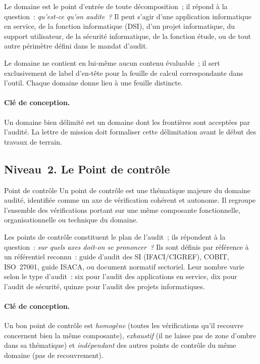 Le domaine est le point d'entrée de toute décomposition~; il répond à la
question~: \emph{qu'est-ce qu'on audite~?} Il peut s'agir d'une application
informatique en service, de la fonction informatique (DSI), d'un projet
informatique, du support utilisateur, de la sécurité informatique, de la
fonction étude, ou de tout autre périmètre défini dans le mandat d'audit.

Le domaine ne contient en lui-même aucun contenu évaluable~; il sert
exclusivement de label d'en-tête pour la feuille de calcul correspondante dans
l'outil. Chaque domaine donne lieu à une feuille distincte.

\paragraph{Clé de conception.}
Un domaine bien délimité est un domaine dont les frontières sont acceptées par
l'audité. La lettre de mission doit formaliser cette délimitation avant le début
des travaux de terrain.

\subsection{Niveau~2. Le Point de contrôle}

\begin{boxdef}{Point de contrôle}
Un point de contrôle est une thématique majeure du domaine audité, identifiée
comme un axe de vérification cohérent et autonome. Il regroupe l'ensemble des
vérifications portant sur une même composante fonctionnelle, organisationnelle
ou technique du domaine.
\end{boxdef}

Les points de contrôle constituent le plan de l'audit~; ils répondent à la
question~: \emph{sur quels axes doit-on se prononcer~?} Ils sont définis par
référence à un référentiel reconnu~: guide d'audit des SI (IFACI/CIGREF), COBIT,
ISO~27001, guide ISACA, ou document normatif sectoriel. Leur nombre varie selon
le type d'audit~: six pour l'audit des applications en service, dix pour
l'audit de sécurité, quinze pour l'audit des projets informatiques.

\paragraph{Clé de conception.}
Un bon point de contrôle est \emph{homogène} (toutes les vérifications qu'il
recouvre concernent bien la même composante), \emph{exhaustif} (il ne laisse
pas de zone d'ombre dans sa thématique) et \emph{indépendant} des autres points
de contrôle du même domaine (pas de recouvrement).

